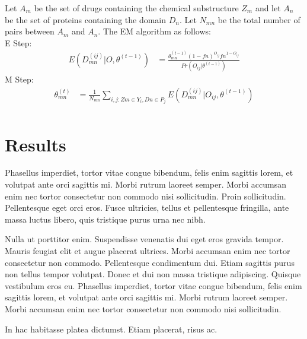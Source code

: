 \documentclass[a0,portrait]{a0poster}
\begin{document}
\begin{multicols}{2}
Let $A_m$ be the set of drugs containing the chemical substructure $Z_m$ and let $A_n$ be the set of proteins containing the domain $D_n$. Let $N_{mn}$ be the total number of pairs between $A_m$ and $A_n$. The EM algorithm as follows:\\
E Step:
\begin{equation}
  \begin{aligned}
    E(D_{mn}^{(ij)}|O,\theta^{(t-1)})
    &=\frac{\theta_{mn}^{(t-1)}(1-\textit{fn})^{O_{ij}}\textit{fn}^{1-O_{ij}}}{Pr(O_{ij}|\theta^{(t-1)})}
  \end{aligned}
\end{equation}
M Step:
\begin{equation}
\begin{aligned}
\theta_{mn}^{(t)}
&=\frac{1}{N_{mn}} \sum_{i,j: Zm\in Y_i, Dn\in P_j}E(D_{mn}^{(ij)}|O_{ij},\theta^{(t-1)})\\
\end{aligned}
\end{equation}
\section*{Results}

%
%
Phasellus imperdiet, tortor vitae congue bibendum, felis enim sagittis lorem, et volutpat ante orci sagittis mi. Morbi rutrum laoreet semper. Morbi accumsan enim nec tortor consectetur non commodo nisi sollicitudin. Proin sollicitudin. Pellentesque eget orci eros. Fusce ultricies, tellus et pellentesque fringilla, ante massa luctus libero, quis tristique purus urna nec nibh.

Nulla ut porttitor enim. Suspendisse venenatis dui eget eros gravida tempor. Mauris feugiat elit et augue placerat ultrices. Morbi accumsan enim nec tortor consectetur non commodo. Pellentesque condimentum dui. Etiam sagittis purus non tellus tempor volutpat. Donec et dui non massa tristique adipiscing. Quisque vestibulum eros eu. Phasellus imperdiet, tortor vitae congue bibendum, felis enim sagittis lorem, et volutpat ante orci sagittis mi. Morbi rutrum laoreet semper. Morbi accumsan enim nec tortor consectetur non commodo nisi sollicitudin.


In hac habitasse platea dictumst. Etiam placerat, risus ac.


\end{multicols}
\end{document}
